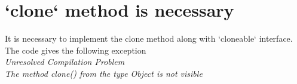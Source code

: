 \section{`clone` method is necessary \label{cloneMethod}}
It is necessary to implement the clone method along with `cloneable` interface. 
The code  gives the following exception \\
\textit{Unresolved Compilation Problem\\	The method clone() from the type Object is not visible
}